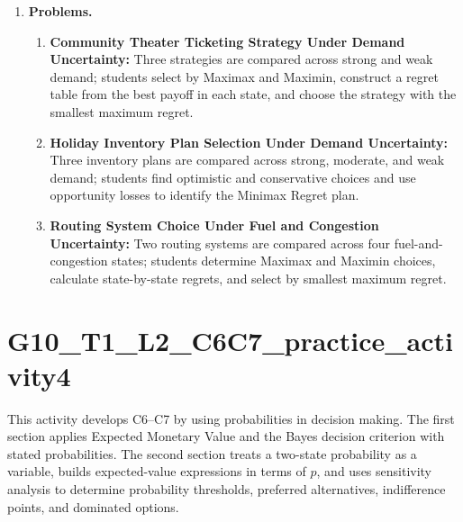 	\begin{enumerate}
		\item \textbf{Problems.}
		\begin{enumerate}
			\item \textbf{Community Theater Ticketing Strategy Under Demand Uncertainty:} Three strategies are compared across strong and weak demand; students select by Maximax and Maximin, construct a regret table from the best payoff in each state, and choose the strategy with the smallest maximum regret.
			\item \textbf{Holiday Inventory Plan Selection Under Demand Uncertainty:} Three inventory plans are compared across strong, moderate, and weak demand; students find optimistic and conservative choices and use opportunity losses to identify the Minimax Regret plan.
			\item \textbf{Routing System Choice Under Fuel and Congestion Uncertainty:} Two routing systems are compared across four fuel-and-congestion states; students determine Maximax and Maximin choices, calculate state-by-state regrets, and select by smallest maximum regret.
		\end{enumerate}
	\end{enumerate}

	\section{G10\_T1\_L2\_C6C7\_practice\_activity4}
	This activity develops C6--C7 by using probabilities in decision making. The first section applies Expected Monetary Value and the Bayes decision criterion with stated probabilities. The second section treats a two-state probability as a variable, builds expected-value expressions in terms of $p$, and uses sensitivity analysis to determine probability thresholds, preferred alternatives, indifference points, and dominated options.

